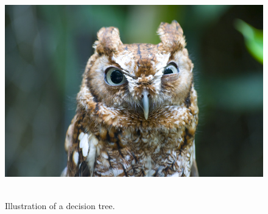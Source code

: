 \begin{figure}
    \centering
        \includegraphics[width=\textwidth]{./Figs/placeholder.jpeg}
    ~ %
    \caption{Illustration of a decision tree.}
    \label{fig:DT}
\end{figure}

